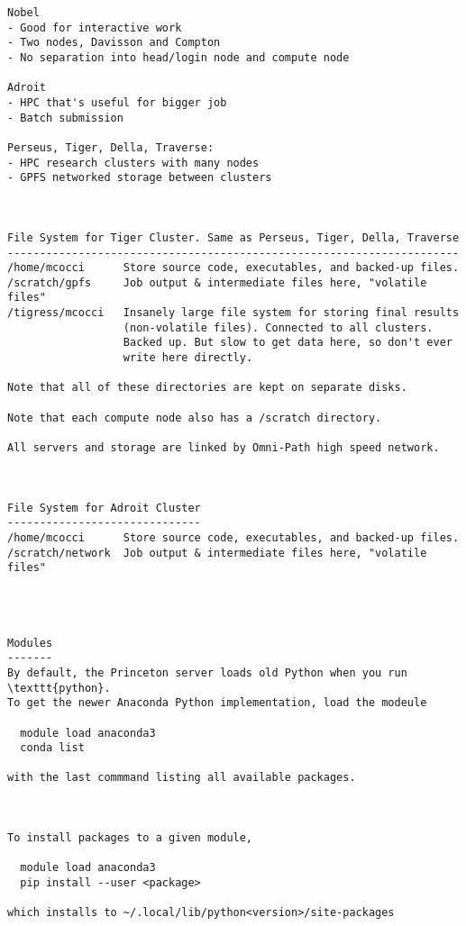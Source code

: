 \documentclass[12pt]{article}
\theoremstyle{plain}
\theoremstyle{definition}
\theoremstyle{remark}
\begin{document}
\begin{lstlisting}
Nobel
- Good for interactive work
- Two nodes, Davisson and Compton
- No separation into head/login node and compute node

Adroit
- HPC that's useful for bigger job
- Batch submission

Perseus, Tiger, Della, Traverse:
- HPC research clusters with many nodes
- GPFS networked storage between clusters



File System for Tiger Cluster. Same as Perseus, Tiger, Della, Traverse
----------------------------------------------------------------------
/home/mcocci      Store source code, executables, and backed-up files.
/scratch/gpfs     Job output & intermediate files here, "volatile files"
/tigress/mcocci   Insanely large file system for storing final results
                  (non-volatile files). Connected to all clusters.
                  Backed up. But slow to get data here, so don't ever
                  write here directly.

Note that all of these directories are kept on separate disks.

Note that each compute node also has a /scratch directory.

All servers and storage are linked by Omni-Path high speed network.



File System for Adroit Cluster
------------------------------
/home/mcocci      Store source code, executables, and backed-up files.
/scratch/network  Job output & intermediate files here, "volatile files"




Modules
-------
By default, the Princeton server loads old Python when you run
\texttt{python}.
To get the newer Anaconda Python implementation, load the modeule

  module load anaconda3
  conda list

with the last commmand listing all available packages.



To install packages to a given module,

  module load anaconda3
  pip install --user <package>

which installs to ~/.local/lib/python<version>/site-packages





\end{lstlisting}
\end{document}
